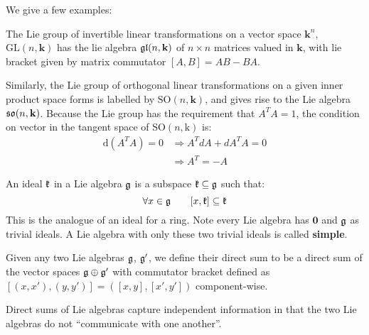 		We give a few examples:
		\begin{eg}
			The Lie group of invertible linear transformations on a vector space $\mathbf k^n$, $\mathrm{GL}(n, \mathbf k)$ has the lie algebra $\frak{gl}(n, \mathbf k)$ of $n \times n$ matrices valued in $\mathbf k$, with lie bracket given by matrix commutator $[A, B] = AB - BA$.
		\end{eg}
		
		\begin{eg}
			Similarly, the Lie group of orthogonal linear transformations on a given inner product space forms is labelled by $\mathrm{SO}(n, \mathbf k)$, and gives rise to the Lie algebra $\frak{so}(n, \mathbf k)$. Because the Lie group has the requirement that $A^T A = 1$, the condition on vector in the tangent space of $\mathrm{SO}(n, \mathrm k)$ is:
			\begin{equation}
				\begin{aligned}
					\mathrm d(A^T A)  = 0 &\Rightarrow A^T dA + d{A^T} A = 0 \\
									&\Rightarrow A^{T} = - A
				\end{aligned}
			\end{equation}
		\end{eg}
		
		\begin{defn}[Ideal]
			An ideal $\frak k$ in a Lie algebra $\frak g$ is a subspace $\frak k \subseteq \frak g$ such that:
			\begin{equation}
				 \forall x \in \frak g \qquad [x, \frak k] \subseteq \frak k
			\end{equation}
			This is the analogue of an ideal for a ring. Note every Lie algebra has $\mathbf 0$ and $\frak g$ as trivial ideals. A Lie algebra with only these two trivial ideals is called \textbf{simple}.
		\end{defn}
		
		\begin{defn}
			Given any two Lie algebras $\frak g$, $\frak g'$, we define their direct sum to be a direct sum of the vector spaces $\frak g \oplus \frak g'$ with commutator bracket defined as $[(x,x'), (y, y')] = ([x, y], [x', y'])$ component-wise.
		\end{defn}
		Direct sums of Lie algebras capture independent information in that the two Lie algebras do not ``communicate with one another''.
		
